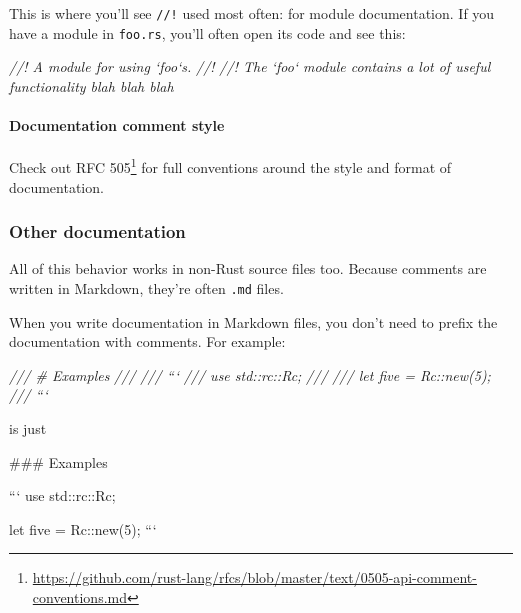 \documentclass[a4paper,]{book}
\newenvironment{Shaded}{\begin{snugshade}}{\end{snugshade}}
\newcommand{\CommentTok}[1]{\textcolor[rgb]{0.56,0.35,0.01}{\textit{{#1}}}}
\newcommand{\FunctionTok}[1]{\textcolor[rgb]{0.00,0.00,0.00}{{#1}}}
\newcommand{\NormalTok}[1]{{#1}}
\renewcommand{\href}[2]{#2\footnote{\url{#1}}}
\let\oldparagraph\paragraph
\renewcommand{\paragraph}[1]{\oldparagraph{#1}\mbox{}}
\begin{document}
This is where you'll see \texttt{//!} used most often: for module
documentation. If you have a module in \texttt{foo.rs}, you'll often
open its code and see this:

\begin{Shaded}
\begin{Highlighting}[]
\CommentTok{//! A module for using `foo`s.}
\CommentTok{//!}
\CommentTok{//! The `foo` module contains a lot of useful functionality blah blah blah}
\end{Highlighting}
\end{Shaded}

\paragraph{Documentation comment
style}\label{documentation-comment-style}

Check out
\href{https://github.com/rust-lang/rfcs/blob/master/text/0505-api-comment-conventions.md}{RFC
505} for full conventions around the style and format of documentation.

\subsubsection{Other documentation}\label{other-documentation}

All of this behavior works in non-Rust source files too. Because
comments are written in Markdown, they're often \texttt{.md} files.

When you write documentation in Markdown files, you don't need to prefix
the documentation with comments. For example:

\begin{Shaded}
\begin{Highlighting}[]
\CommentTok{/// # Examples}
\CommentTok{///}
\CommentTok{/// ```}
\CommentTok{/// use std::rc::Rc;}
\CommentTok{///}
\CommentTok{/// let five = Rc::new(5);}
\CommentTok{/// ```}
\end{Highlighting}
\end{Shaded}

is just

\begin{Shaded}
\begin{Highlighting}[]
\FunctionTok{### Examples}

\NormalTok{```}
\NormalTok{use std::rc::Rc;}

\NormalTok{let five = Rc::new(5);}
\NormalTok{```}
\end{Highlighting}
\end{Shaded}
\end{document}
